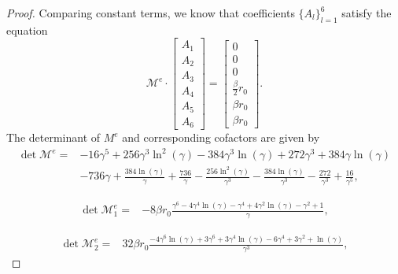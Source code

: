 \documentclass[11pt,letterpaper]{amsart}
\newcommand{\mM}{\mathcal{M}}
\theoremstyle{definition}
\theoremstyle{remark}
\numberwithin{equation}{section}
\begin{document}
\begin{proof}
Comparing constant terms, we know that coefficients $\{A_l\}_{l=1}^6$ satisfy the equation
\begin{equation}\label{eq:A}
    \mM^{e}\cdot \begin{bmatrix}
        A_1\\
        A_2\\
        A_3\\
        A_4\\
        A_5\\
        A_6
    \end{bmatrix}=\begin{bmatrix}
        0\\
        0\\
        0\\
        \frac{\beta}{2}r_0\\
        \beta r_0\\
        \beta r_0
    \end{bmatrix}.
\end{equation}
The determinant of $M^e$ and corresponding cofactors are given by
\begin{equation}
    \begin{split}
        \det \mM^e=&-16\gamma^5 + 256\gamma^3 \ln^2(\gamma) - 384\gamma^3 \ln(\gamma) + 272\gamma^3 + 384\gamma \ln(\gamma)\\ 
        &- 736\gamma+ \frac{384 \ln(\gamma)}{\gamma} + \frac{736}{\gamma} - \frac{256 \ln^2(\gamma)}{\gamma^3} - \frac{384 \ln(\gamma)}{\gamma^3} - \frac{272}{\gamma^3} + \frac{16}{\gamma^5},
    \end{split}
\end{equation}

\begin{equation}
\begin{split}
    \det \mM^e_1=&-8 \beta r_0\frac{ \gamma^6 - 4 \gamma^4 \ln(\gamma) - \gamma^4 + 4 \gamma^2 \ln(\gamma) - \gamma^2+ 1}{\gamma},
\end{split}    
\end{equation}

\begin{equation}
    \begin{split}
        \det \mM^e_2=&32 \beta r_0\frac{-4 \gamma^6 \ln(\gamma) + 3 \gamma^6 + 3 \gamma^4 \ln(\gamma) - 6 \gamma^4  + 3 \gamma^2 +  \ln(\gamma)}{\gamma^3},
    \end{split}
\end{equation}


\end{proof}
\end{document}
